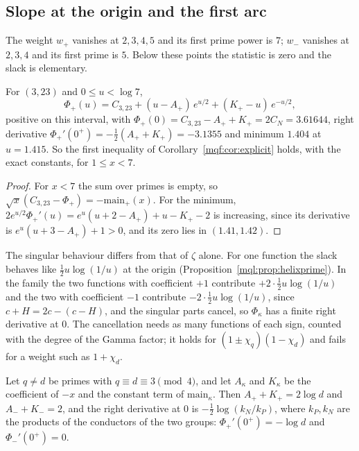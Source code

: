 \subsection{Slope at the origin and the first arc}\label{mqf:sub:firstarc}

The weight $w_+$ vanishes at $2,3,4,5$ and its first prime power is $7$; $w_-$ vanishes at $2,3,4$ and its first prime is $5$. Below these points the statistic is zero and the slack is elementary.

\begin{proposition}[The first arc for $\kappa=+1$]\label{mqf:prop:firstarc}
For $(3,23)$ and $0\le u<\log7$,
\[
\Phi_+(u)=C_{3,23}+(u-A_+)\,e^{u/2}+(K_+-u)\,e^{-u/2},
\]
positive on this interval, with $\Phi_+(0)=C_{3,23}-A_++K_+=2C_N=3.61644$, right derivative $\Phi_+'(0^+)=-\frac12(A_++K_+)=-3.1355$ and minimum $1.404$ at $u=1.415$. So the first inequality of Corollary~\ref{mqf:cor:explicit} holds, with the exact constants, for $1\le x<7$.
\end{proposition}

\begin{proof}
For $x<7$ the sum over primes is empty, so $\sqrt x(C_{3,23}-\Phi_+)=-\mathrm{main}_+(x)$. For the minimum, $2e^{u/2}\Phi_+'(u)=e^u(u+2-A_+)+u-K_+-2$ is increasing, since its derivative is $e^u(u+3-A_+)+1>0$, and its zero lies in $(1.41,1.42)$.
\end{proof}

The singular behaviour differs from that of $\zeta$ alone. For one function the slack behaves like $\frac12u\log(1/u)$ at the origin (Proposition~\ref{mql:prop:helixprime}). In the family the two functions with coefficient $+1$ contribute $+2\cdot\frac12u\log(1/u)$ and the two with coefficient $-1$ contribute $-2\cdot\frac12u\log(1/u)$, since $c+H=2c-(c-H)$, and the singular parts cancel, so $\Phi_\kappa$ has a finite right derivative at $0$. The cancellation needs as many functions of each sign, counted with the degree of the Gamma factor; it holds for $(1\pm\chi_q)(1-\chi_d)$ and fails for a weight such as $1+\chi_d$.

\begin{proposition}\label{mqf:prop:slope}
Let $q\ne d$ be primes with $q\equiv d\equiv3\pmod4$, and let $A_\kappa$ and $K_\kappa$ be the coefficient of $-x$ and the constant term of $\mathrm{main}_\kappa$. Then $A_++K_+=2\log d$ and $A_-+K_-=2$, and the right derivative at $0$ is $-\frac12\log(k_N/k_P)$, where $k_P,k_N$ are the products of the conductors of the two groups: $\Phi_+'(0^+)=-\log d$ and $\Phi_-'(0^+)=0$.
\end{proposition}

